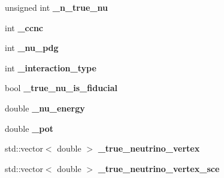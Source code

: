 \begin{DoxyCompactItemize}
\item 
\hypertarget{classlee_1_1ElectronNeutrinoFilter_a4f05be9559cb86c6cc44777f084bac9e}{unsigned int {\bfseries \-\_\-n\-\_\-true\-\_\-nu}}\label{classlee_1_1ElectronNeutrinoFilter_a4f05be9559cb86c6cc44777f084bac9e}

\item 
\hypertarget{classlee_1_1ElectronNeutrinoFilter_ad81983f8dff6ebf659accd8bcf9cd592}{int {\bfseries \-\_\-ccnc}}\label{classlee_1_1ElectronNeutrinoFilter_ad81983f8dff6ebf659accd8bcf9cd592}

\item 
\hypertarget{classlee_1_1ElectronNeutrinoFilter_a94d49a87b7b626a8c752ad333094a8a0}{int {\bfseries \-\_\-nu\-\_\-pdg}}\label{classlee_1_1ElectronNeutrinoFilter_a94d49a87b7b626a8c752ad333094a8a0}

\item 
\hypertarget{classlee_1_1ElectronNeutrinoFilter_ac8d699e9d44882c88e543548d5937405}{int {\bfseries \-\_\-interaction\-\_\-type}}\label{classlee_1_1ElectronNeutrinoFilter_ac8d699e9d44882c88e543548d5937405}

\item 
\hypertarget{classlee_1_1ElectronNeutrinoFilter_a6cf1bb1a9189ea476599097e31bdb517}{bool {\bfseries \-\_\-true\-\_\-nu\-\_\-is\-\_\-fiducial}}\label{classlee_1_1ElectronNeutrinoFilter_a6cf1bb1a9189ea476599097e31bdb517}

\item 
\hypertarget{classlee_1_1ElectronNeutrinoFilter_aef727e4de42995c92b6f679c2134e2d0}{double {\bfseries \-\_\-nu\-\_\-energy}}\label{classlee_1_1ElectronNeutrinoFilter_aef727e4de42995c92b6f679c2134e2d0}

\item 
\hypertarget{classlee_1_1ElectronNeutrinoFilter_afafabcd6b8132be5b9140806c1edff7c}{double {\bfseries \-\_\-pot}}\label{classlee_1_1ElectronNeutrinoFilter_afafabcd6b8132be5b9140806c1edff7c}

\item 
\hypertarget{classlee_1_1ElectronNeutrinoFilter_a472e49172a8e61052ca8b41dbf718a1e}{std\-::vector$<$ double $>$ {\bfseries \-\_\-true\-\_\-neutrino\-\_\-vertex}}\label{classlee_1_1ElectronNeutrinoFilter_a472e49172a8e61052ca8b41dbf718a1e}

\item 
\hypertarget{classlee_1_1ElectronNeutrinoFilter_a96d8f690fcc654c52df01d0740ddb4b0}{std\-::vector$<$ double $>$ {\bfseries \-\_\-true\-\_\-neutrino\-\_\-vertex\-\_\-sce}}\label{classlee_1_1ElectronNeutrinoFilter_a96d8f690fcc654c52df01d0740ddb4b0}


\end{DoxyCompactItemize}
